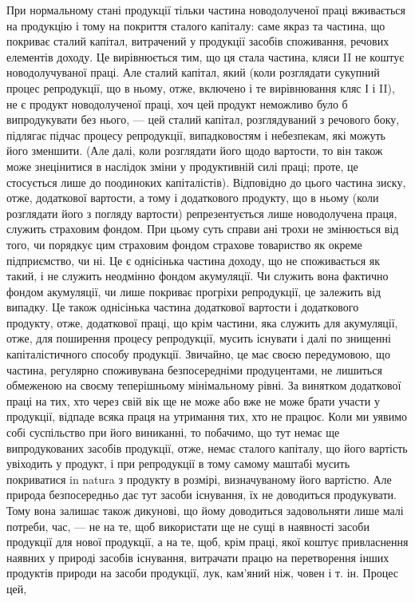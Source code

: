 При нормальному стані продукції тільки частина новодолученої праці
вживається на продукцію і тому на покриття сталого капіталу: саме якраз та
частина, що покриває сталий капітал, витрачений у продукції засобів споживання,
речових елементів доходу. Це вирівнюється тим, що ця стала частина,
кляси II не коштує новодолучуваної праці. Але сталий капітал, який (коли розглядати
сукупний процес репродукції, що в ньому, отже, включено і те вирівнювання
кляс І і II), не є продукт новодолученої праці, хоч цей продукт неможливо
було б випродукувати без нього, — цей сталий капітал, розглядуваний з речового
боку, підлягає підчас процесу репродукції, випадковостям і небезпекам,
які можуть його зменшити. (Але далі, коли розглядати його щодо вартости, то
він також може знецінитися в наслідок зміни у продуктивній силі праці;
проте, це стосується лише до поодиноких капіталістів). Відповідно до цього частина
зиску, отже, додаткової вартости, а тому і додаткового продукту, що в ньому
(коли розглядати його з погляду вартости) репрезентується лише новодолучена
праця, служить страховим фондом. При цьому суть справи ані трохи не змінюється
від того, чи порядкує цим страховим фондом страхове товариство як
окреме підприємство, чи ні. Це є однісінька частина доходу, що не споживається
як такий, і не служить неодмінно фондом акумуляції. Чи служить вона фактично
фондом акумуляції, чи лише покриває прогріхи репродукції, це залежить від
випадку. Це також однісінька частина додаткової вартости і додаткового продукту,
отже, додаткової праці, що крім частини, яка служить для акумуляції, отже,
для поширення процесу репродукції, мусить існувати і далі по знищенні
капіталістичного способу продукції. Звичайно, це має своєю передумовою, що
частина, регулярно споживувана безпосередніми продуцентами, не лишиться обмеженою на своєму
теперішньому мінімальному рівні. За винятком додаткової
праці на тих, хто через свій вік ще не може або вже не може брати участи у продукції,
відпаде всяка праця на утримання тих, хто не працює. Коли ми уявимо
собі суспільство при його виниканні, то побачимо, що тут немає ще випродукованих
засобів продукції, отже, немає сталого капіталу, що його вартість увіходить
у продукт, і при репродукції в тому самому маштабі мусить покриватися
in natura з продукту в розмірі, визначуваному його вартістю. Але природа
безпосередньо дає тут засоби існування, їх не доводиться продукувати. Тому
вона залишає також дикунові, що йому доводиться задовольняти лише малі потреби,
час, — не на те, щоб використати ще не сущі в наявності засоби продукції для
нової продукції, а на те, щоб, крім праці, якої коштує привласнення наявних
у природі засобів існування, витрачати працю на перетворення інших продуктів
природи на засоби продукції, лук, кам’яний ніж, човен і т. ін. Процес цей,
\parbreak{}  %
